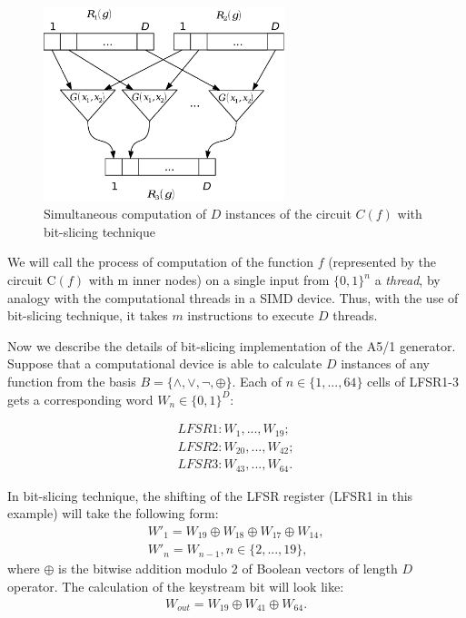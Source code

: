 \documentclass[runningheads,a4paper]{llncs}[2015/06/24]
\begin{document}
\begin{figure} 
	\centering
	\includegraphics[width=7cm]{./bitslice.eps}
	\caption{Simultaneous computation of $D$ instances of the circuit $C(f)$ with bit-slicing technique} 
	\label{fig:bitsl} 
\end{figure}

We will call the process of computation of the function $f$ (represented by the circuit C$(f)$ with m inner nodes) 
on a single input from $\{0,1\}^n$ a \textit{thread}, by analogy with the computational threads 
in a SIMD device. Thus, with the use of bit-slicing technique, it takes $m$
instructions to execute $D$ threads.

Now we describe the details of bit-slicing implementation of the A5/1
generator. Suppose that a computational device is able to calculate $D$
instances of any function from the basis $B=\{\land,\lor,\neg,\oplus\}$. Each
of $n\in\{1,...,64\}$ cells of LFSR1-3 gets a corresponding word $W_n\in\{0,1\}^D$:

\begin{gather*}
	LFSR1:W_1,...,W_{19}; \\
	LFSR2:W_{20},...,W_{42}; \\
	LFSR3:W_{43},...,W_{64}.
\end{gather*}

In bit-slicing technique, the shifting of the LFSR register (LFSR1 in this
example) will take the following form: 
\begin{gather*} 
	W'_1=W_{19} \oplus W_{18} \oplus W_{17} \oplus W_{14}, \\
	W'_n=W_{n-1}, n \in \{2,...,19\},
\end{gather*}
where $\oplus$ is the bitwise addition modulo 2 of Boolean vectors of length
$D$ operator. The calculation of the keystream bit will look like:
\begin{gather*} 
	W_{out}=W_{19} \oplus W_{41} \oplus W_{64}.
\end{gather*}
\end{document}
